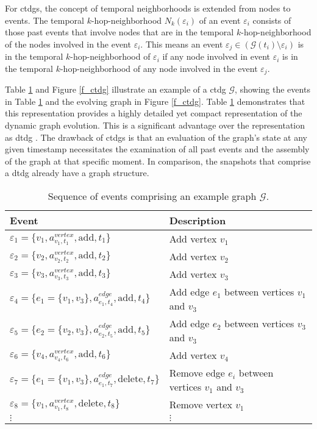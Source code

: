 For \glspl{ctdg}, the concept of temporal neighborhoods is extended from nodes to events. The temporal $k$-hop-neighborhood $N_k(\varepsilon_i)$ of an event $\varepsilon_{i}$ consists of those past events that involve nodes that are in the temporal $k$-hop-neighborhood of the nodes involved in the event $\varepsilon_{i}$. This means an event $\varepsilon_{j} \in (\mathcal{G}(t_i) \setminus \varepsilon_{i})$ is in the temporal $k$-hop-neighborhood of $\varepsilon_{i}$ if any node involved in event $\varepsilon_{i}$ is in the temporal $k$-hop-neighborhood of any node involved in the event $\varepsilon_{j}$.

Table \ref{t_ctdg_events} and Figure \ref{f_ctdg} illustrate an example of a \gls{ctdg} $\mathcal{G}$, showing the events in Table \ref{t_ctdg_events} and the evolving graph in Figure \ref{f_ctdg}. Table \ref{t_ctdg_events} demonstrates that this representation provides a highly detailed yet compact representation of the dynamic graph evolution. This is a significant advantage over the representation as \gls{dtdg} \cite{trivedi_dyrep_2019}. The drawback of \glspl{ctdg} is that an evaluation of the graph's state at any given timestamp necessitates the examination of all past events and the assembly of the graph at that specific moment. In comparison, the snapshots that comprise a \gls{dtdg} already have a graph structure.

\begin{table}[ht]
    \centering
    \begin{tabular}{|l|l|}
        \hline
        Event & Description \\
        \hline
        $\varepsilon_{1} = \{v_1, a^{vertex}_{v_1, t_1}, \mathrm{add}, t_1\}$ & Add vertex $v_1$\\
        $\varepsilon_{2} = \{v_2, a^{vertex}_{v_2, t_2}, \mathrm{add}, t_2\}$ & Add vertex $v_2$\\
        $\varepsilon_{3} = \{v_3, a^{vertex}_{v_3, t_3}, \mathrm{add}, t_3\}$ & Add vertex $v_3$\\
        $\varepsilon_{4} = \{e_1 = \{v_1, v_3\}, a^{edge}_{e_1, t_4}, \mathrm{add}, t_4\}$ & Add edge $e_1$ between vertices $v_1$ and $v_3$\\
        $\varepsilon_{5} = \{e_2 = \{v_2, v_3\}, a^{edge}_{e_2, t_5}, \mathrm{add}, t_5\}$ & Add edge $e_2$ between vertices $v_3$ and $v_3$\\
        $\varepsilon_{6} = \{v_4, a^{vertex}_{v_4, t_6}, \mathrm{add}, t_6\}$ & Add vertex $v_4$\\
        $\varepsilon_{7} = \{e_1 = \{v_1, v_3\}, a^{edge}_{e_1, t_7}, \mathrm{delete}, t_7\}$ & Remove edge $e_i$ between vertices $v_1$ and $v_3$\\
        $\varepsilon_{8} = \{v_1, a^{vertex}_{v_1, t_8}, \mathrm{delete}, t_8\}$ & Remove vertex $v_1$\\
        $\vdots$ & $\vdots$ \\
    \end{tabular}
    \caption{Sequence of events comprising an example graph $\mathcal{G}.$}
    \label{t_ctdg_events}
\end{table}

